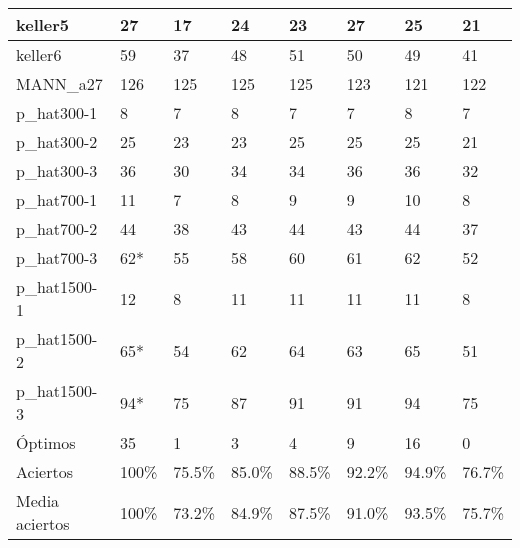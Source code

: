 \begin{table}[H]
\begin{tabular}{|l|l|l|l|l|l|l|l|}
keller5            & 27 & 17 & 24 & 23 & 27 & 25 & 21 \\ \hline
keller6            & 59 & 37 & 48 & 51 & 50 & 49 & 41 \\ \hline
MANN\_a27          & 126 & 125 & 125 & 125 & 123 & 121 & 122 \\ \hline
p\_hat300-1        & 8 & 7 & 8 & 7 & 7 & 8 & 7 \\ \hline
p\_hat300-2        & 25 & 23 & 23 & 25 & 25 & 25 & 21 \\ \hline
p\_hat300-3        & 36 & 30 & 34 & 34 & 36 & 36 & 32 \\ \hline
p\_hat700-1        & 11 & 7 & 8 & 9 & 9 & 10 & 8 \\ \hline
p\_hat700-2        & 44 & 38 & 43 & 44 & 43 & 44 & 37 \\ \hline
p\_hat700-3        & 62* & 55 & 58 & 60 & 61 & 62 & 52 \\ \hline
p\_hat1500-1       & 12 & 8 & 11 & 11 & 11 & 11 & 8 \\ \hline
p\_hat1500-2       & 65* & 54 & 62 & 64 & 63 & 65 & 51 \\ \hline
p\_hat1500-3       & 94* & 75 & 87 & 91 & 91 & 94 & 75 \\ \hline
Óptimos            & 35  & 1  & 3  & 4  & 9  & 16 & 0  \\ \hline
Aciertos           & 100\% & 75.5\% & 85.0\% & 88.5\% & 92.2\% & 94.9\% & 76.7\% \\ \hline
Media aciertos     & 100\% & 73.2\% & 84.9\% & 87.5\% & 91.0\% & 93.5\% & 75.7\% \\ \hline
\end{tabular}
\end{table}

